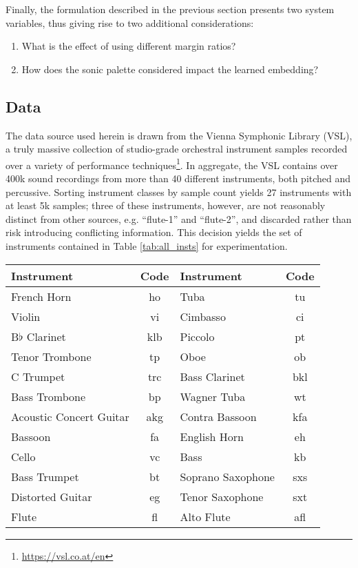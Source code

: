Finally, the formulation described in the previous section presents two system variables, thus giving rise to two additional considerations:

\begin{enumerate}
\item What is the effect of using different margin ratios?
\item How does the sonic palette considered impact the learned embedding?
\end{enumerate}


\subsection{Data}
The data source used herein is drawn from the Vienna Symphonic Library (VSL), a truly massive collection of studio-grade orchestral instrument samples recorded over a variety of performance techniques\footnote{\url{https://vsl.co.at/en}}.
In aggregate, the VSL contains over 400k sound recordings from more than 40 different instruments, both pitched and percussive.
Sorting instrument classes by sample count yields 27 instruments with at least 5k samples; three of these instruments, however, are not reasonably distinct from other sources, e.g. ``flute-1'' and ``flute-2'', and discarded rather than risk introducing conflicting information.
This decision yields the set of instruments contained in Table \ref{tab:all_insts} for experimentation.


\begin{table*}[t]
\begin{center}
\caption{Instruments considered and their corresponding codes.}
\begin{tabular}{l | c || l | c}
Instrument & Code & Instrument & Code \\
\hline
French Horn & ho & Tuba & tu\\
Violin & vi & Cimbasso & ci \\
B$\flat$ Clarinet & klb & Piccolo & pt \\
Tenor Trombone & tp & Oboe & ob \\
C Trumpet & trc & Bass Clarinet & bkl \\
Bass Trombone & bp & Wagner Tuba & wt \\
Acoustic Concert Guitar & akg & Contra Bassoon & kfa \\
Bassoon & fa & English Horn & eh \\
Cello & vc & Bass & kb \\
Bass Trumpet & bt & Soprano Saxophone & sxs \\
Distorted Guitar & eg & Tenor Saxophone & sxt \\
Flute & fl & Alto Flute & afl \\
\hline
\end{tabular}
\label{tab:all_insts}
\end{center}
\end{table*}


